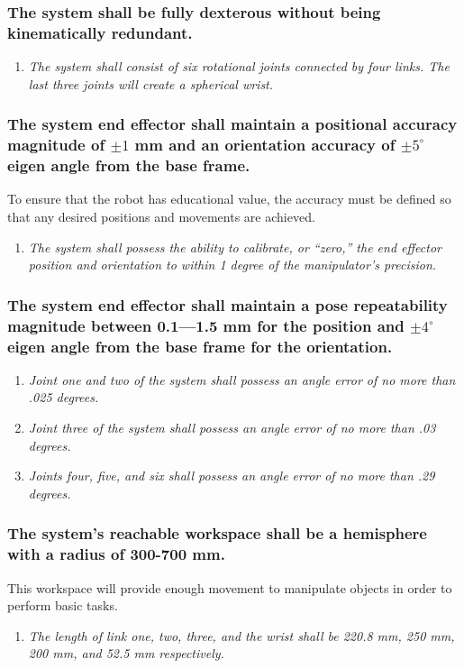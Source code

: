 \documentclass[12pt]{report}
\begin{document}
\subsubsection{The system shall be fully dexterous without being kinematically redundant.}
\begin{enumerate}[label=\thesubsubsection.\alph*,leftmargin=3cm,font=\itshape]
\item \textit{The system shall consist of six rotational joints connected by four links. The last three joints will create a spherical wrist.}
\end{enumerate}

\subsubsection{The system end effector shall maintain a positional accuracy magnitude of \(\pm 1\) mm and an orientation accuracy of \(\pm 5^{\circ}\) eigen angle from the base frame.}
To ensure that the robot has educational value, the accuracy must be defined so that any desired positions and movements are achieved.
\begin{enumerate}[label=\thesubsubsection.\alph*,leftmargin=3cm,font=\itshape]
  \item \textit{The system shall possess the ability to calibrate, or “zero,” the end effector position and orientation to within 1 degree of the manipulator’s precision. }
\end{enumerate}
\subsubsection{The system end effector shall maintain a pose repeatability magnitude between 0.1—1.5 mm for the position and \(\pm 4^{\circ}\) eigen angle from the base frame for the orientation.}
\begin{enumerate}[label=\thesubsubsection.\alph*,leftmargin=3cm,font=\itshape]
  \item \textit{Joint one and two of the system shall possess an angle error of no more than .025 degrees.}
  \item \textit{Joint three of the system shall possess an angle error of no more than .03 degrees.}
  \item \textit{Joints four, five, and six shall possess an angle error of no more than .29 degrees.}
\end{enumerate}
\subsubsection{The system’s reachable workspace shall be a hemisphere with a radius of 300-700 mm.}
This workspace will provide enough movement to manipulate objects in order to perform basic tasks.
\begin{enumerate}[label=\thesubsubsection.\alph*,leftmargin=3cm,font=\itshape]
  \item \textit{The length of link one, two, three, and the wrist shall be 220.8 mm, 250 mm, 200 mm, and 52.5 mm respectively.}
\end{enumerate}
\newpage
\end{document}
